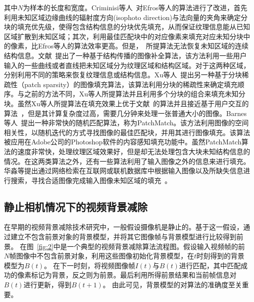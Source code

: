 其中$N$为样本的长度和宽度。Criminisi等人~\cite{Criminisi04regionfilling}对Efros等人的算法进行了改进，首先利用未知区域边缘曲线的辐射度方向(isophoto direction)与法向量的夹角来确定分块的填充优先级，使得包含结构信息的分块优先填充，从而保证纹理信息能从已知区域扩散到未知区域；其次，利用最佳匹配块中的对应像素来填充对应未知分块中的像素，比Efros等人的算法效率更高。但是，~所提算法无法恢复未知区域的连续结构信息。文献~提出了一种基于结构传播的图像补全算法，该方法利用一些用户输入的一些曲线或者直线把未知区域分为纹理区域和结构区域。对于这两种区域，分别利用不同的策略来恢复纹理信息或结构信息。Xu等人~\cite{Xu:2010}提出另一种基于分块稀疏性（patch sparsity）的图像填充算法，该算法利用分块的稀疏性来确定填充顺序。与之前的方法不同，Xu等人所提算法并且利用多个分块的组合来填充未知分块。虽然Xu等人所提算法在填充效果上优于文献~的算法并且接近基于用户交互的算法~\cite{userInpainting}，但是其计算复杂度过高，需要几分钟来处理一张普通大小的图像。Barnes等人~\cite{Barnes:2009}提出一种非常快的随机匹配算法，称为PatchMatch。该方法利用图像的空间相关性，以随机迭代的方式寻找图像的最佳匹配块，并用其进行图像填充。该算法被应用在Adobe公司的Photoshop软件的内容感知填充功能中。虽然PatchMatch算法的速度非常快，处理纹理区域效果好，但是却无法处理包含大块未知结构信息的情况。在这两类算法之外，还有一些算法利用了输入图像之外的信息来进行填充。华淼等提出通过网络检索在互联网或联机数据库中根据输入图像以及所缺失信息进行搜索，寻找合适图像完成输入图像未知区域的填充~\cite{huamiao}。


\subsection{静止相机情况下的视频背景减除}
\label{sec:staticCamera}
在早期的视频背景减除技术研究中，一般假设摄像机是静止的。基于这一假设，通过建立不包含前景对象的背景模型，并将其它图像帧与背景模型进行比较得到前景。
在图~\ref{fig:2}中是一个典型的视频背景减除算法流程图。假设输入视频帧的前$N$帧图像中不包含前景对象，利用这些图像初始化背景模型，在$t$时刻得到的背景模型为$B(t)$。
在下一时刻，将视频图像帧$I(t)$与$B(t)$进行匹配，其中匹配成功的像素标记为背景，反之则为前景。最后利用所得前景结果和当前帧信息对$B(t)$进行更新，得到$B(t+1)$。
由此可见，背景模型的对算法的准确度至关重要。

